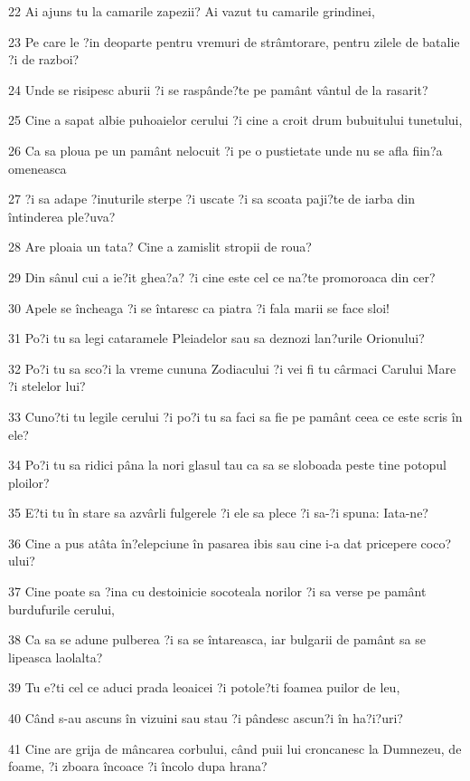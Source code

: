 \par 22 Ai ajuns tu la camarile zapezii? Ai vazut tu camarile grindinei,
\par 23 Pe care le ?in deoparte pentru vremuri de strâmtorare, pentru zilele de batalie ?i de razboi?
\par 24 Unde se risipesc aburii ?i se raspânde?te pe pamânt vântul de la rasarit?
\par 25 Cine a sapat albie puhoaielor cerului ?i cine a croit drum bubuitului tunetului,
\par 26 Ca sa ploua pe un pamânt nelocuit ?i pe o pustietate unde nu se afla fiin?a omeneasca
\par 27 ?i sa adape ?inuturile sterpe ?i uscate ?i sa scoata paji?te de iarba din întinderea ple?uva?
\par 28 Are ploaia un tata? Cine a zamislit stropii de roua?
\par 29 Din sânul cui a ie?it ghea?a? ?i cine este cel ce na?te promoroaca din cer?
\par 30 Apele se încheaga ?i se întaresc ca piatra ?i fala marii se face sloi!
\par 31 Po?i tu sa legi cataramele Pleiadelor sau sa deznozi lan?urile Orionului?
\par 32 Po?i tu sa sco?i la vreme cununa Zodiacului ?i vei fi tu cârmaci Carului Mare ?i stelelor lui?
\par 33 Cuno?ti tu legile cerului ?i po?i tu sa faci sa fie pe pamânt ceea ce este scris în ele?
\par 34 Po?i tu sa ridici pâna la nori glasul tau ca sa se sloboada peste tine potopul ploilor?
\par 35 E?ti tu în stare sa azvârli fulgerele ?i ele sa plece ?i sa-?i spuna: Iata-ne?
\par 36 Cine a pus atâta în?elepciune în pasarea ibis sau cine i-a dat pricepere coco?ului?
\par 37 Cine poate sa ?ina cu destoinicie socoteala norilor ?i sa verse pe pamânt burdufurile cerului,
\par 38 Ca sa se adune pulberea ?i sa se întareasca, iar bulgarii de pamânt sa se lipeasca laolalta?
\par 39 Tu e?ti cel ce aduci prada leoaicei ?i potole?ti foamea puilor de leu,
\par 40 Când s-au ascuns în vizuini sau stau ?i pândesc ascun?i în ha?i?uri?
\par 41 Cine are grija de mâncarea corbului, când puii lui croncanesc la Dumnezeu, de foame, ?i zboara încoace ?i încolo dupa hrana?

